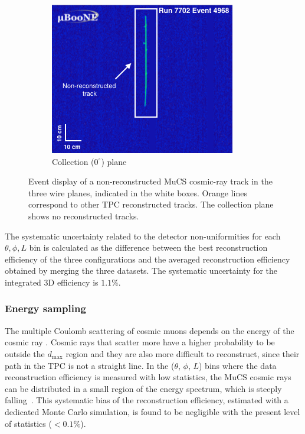 \documentclass[a4paper,11pt]{article}
\begin{document}
\begin{figure}[htbp]
\begin{center}
    \begin{subfigure}{0.5\textwidth}
      \includegraphics[width=\linewidth]{figures/y.png}
      \caption{Collection ($0^{\circ}$) plane} \label{fig:y}
    \end{subfigure}    \caption{Event display of a non-reconstructed MuCS cosmic-ray track in the three wire planes, indicated in the white boxes. Orange lines correspond to other TPC reconstructed tracks. The collection plane shows no reconstructed tracks.} \label{fig:example}
  \end{center}
\end{figure}

The systematic uncertainty related to the detector non-uniformities for each $\theta,\phi,L$ bin is calculated as the difference between the best reconstruction efficiency of the three configurations and the averaged reconstruction efficiency obtained by merging the three datasets.%
The systematic uncertainty for the integrated 3D efficiency is $1.1\%$.

\subsubsection{Energy sampling}
The multiple Coulomb scattering of cosmic muons depends on the energy of the cosmic ray \cite{pdg}. Cosmic rays that scatter more have a higher probability to be outside the $d_{\mathrm{max}}$ region and they are also more difficult to reconstruct, since their path in the TPC is not a straight line. In the ($\theta$, $\phi$, $L$) bins where the data reconstruction efficiency is measured with low statistics, the MuCS cosmic rays can be distributed in a small region of the energy spectrum, which is steeply falling~\cite{corsika}. This systematic bias of the reconstruction efficiency, estimated with a dedicated Monte Carlo simulation, is found to be negligible with the present level of statistics ($<0.1\%$).
\end{document}
